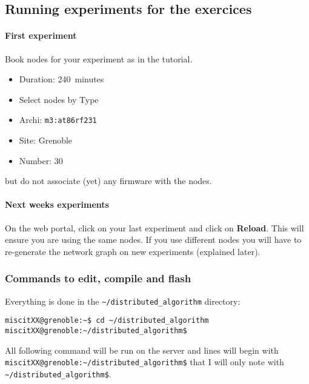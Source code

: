 \documentclass{article}
\begin{document}
\subsection{Running experiments for the exercices}

\paragraph{First experiment} Book nodes for your experiment as in the tutorial.
\begin{itemize}
\item Duration: 240~minutes
\item Select nodes by Type
\item Archi: \texttt{m3:at86rf231}
\item Site: Grenoble
\item Number: $30$
\end{itemize}
but do not associate (yet) any firmware with the nodes.

\paragraph{Next weeks experiments} On the web portal, click on your last
experiment and click on \textbf{Reload}. This will ensure you are using the
same nodes. If you use different nodes you will have to re-generate the network
graph on new experiments (explained later).

\subsubsection{Commands to edit, compile and flash}

Everything is done in the \verb=~/distributed_algorithm= directory:
\begin{verbatim}
miscitXX@grenoble:~$ cd ~/distributed_algorithm
miscitXX@grenoble:~/distributed_algorithm$
\end{verbatim}

All following command will be run on the server and lines will begin with\\
\verb=miscitXX@grenoble:~/distributed_algorithm$= that I will only note with
\verb=~/distributed_algorithm$=.
\end{document}
